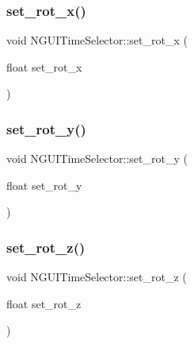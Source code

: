 \subsubsection{\texorpdfstring{set\+\_\+rot\+\_\+x()}{set\_rot\_x()}}
{\footnotesize\ttfamily void N\+G\+U\+I\+Time\+Selector\+::set\+\_\+rot\+\_\+x (\begin{DoxyParamCaption}\item[{float}]{set\+\_\+rot\+\_\+x }\end{DoxyParamCaption})}

\hypertarget{class_n_g_u_i_time_selector_ad06ee278395d6086af51c5f9cf52288a}{}\label{class_n_g_u_i_time_selector_ad06ee278395d6086af51c5f9cf52288a} 
\subsubsection{\texorpdfstring{set\+\_\+rot\+\_\+y()}{set\_rot\_y()}}
{\footnotesize\ttfamily void N\+G\+U\+I\+Time\+Selector\+::set\+\_\+rot\+\_\+y (\begin{DoxyParamCaption}\item[{float}]{set\+\_\+rot\+\_\+y }\end{DoxyParamCaption})}

\hypertarget{class_n_g_u_i_time_selector_a2469ec2971ce9d20c8e3d5b3f0e91523}{}\label{class_n_g_u_i_time_selector_a2469ec2971ce9d20c8e3d5b3f0e91523} 
\subsubsection{\texorpdfstring{set\+\_\+rot\+\_\+z()}{set\_rot\_z()}}
{\footnotesize\ttfamily void N\+G\+U\+I\+Time\+Selector\+::set\+\_\+rot\+\_\+z (\begin{DoxyParamCaption}\item[{float}]{set\+\_\+rot\+\_\+z }\end{DoxyParamCaption})}

\hypertarget{class_n_g_u_i_time_selector_afef939839cc84dc545f335ef89d75b37}{}\label{class_n_g_u_i_time_selector_afef939839cc84dc545f335ef89d75b37} 
